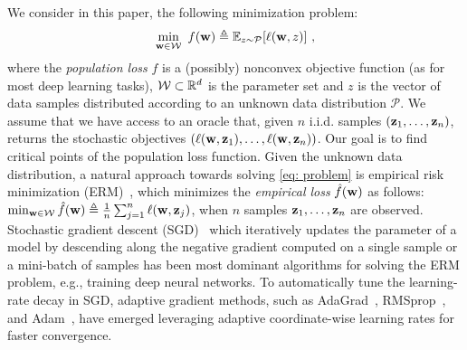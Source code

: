 \documentclass[11pt]{article}
\begin{document}
We consider in this paper, the following minimization problem:
\begin{equation} \label{eq: problem}
 \min_{\w \in \cW}~ f({\w})  \triangleq {\mathbb{E}_{z \sim \mathcal{P}}}[\ell(\w,z)]~,
\end{equation}
where the \emph{population loss} $f$ is a (possibly) nonconvex objective function (as for most deep learning tasks), $\cW \subset \R^d$ is the parameter set and $z$ is the vector of data samples distributed according to an unknown data distribution $\mathcal{P}$. 
We assume that we have access to an oracle that, given $n $ i.i.d. samples $(\mathbf{z}_{1}, \dots, \mathbf{z}_{n})$, returns the stochastic objectives $(\ell(\mathbf{w},\mathbf{z}_{1}), \dots, \ell(\mathbf{w},\mathbf{z}_{n}))$.
Our goal is to find critical points of the population loss function.
Given the unknown data distribution, a natural approach towards solving \eqref{eq: problem} is empirical risk minimization (ERM)~\citep{shbe14}, which minimizes the \emph{empirical loss} $\hat f(\mathbf{w})$ as follows: $\min_{\w \in \cW}     \hat f(\w)  \triangleq \frac{1}{n}\sum_{j =1}^{n} \ell(\w, \z_j)$, when $n$ samples $\mathbf{z}_{1}, \dots, \mathbf{z}_{n}$ are observed.
Stochastic gradient descent (SGD)~\citep{romo51} which iteratively updates the parameter of a model by descending along the negative gradient computed on a single sample or a mini-batch of samples has been most dominant algorithms for solving the ERM problem, e.g., training deep neural networks. To automatically tune the learning-rate decay in SGD, adaptive gradient methods, such as AdaGrad~\citep{duha11}, RMSprop~\citep{tige12}, and Adam~\citep{kiba15}, have emerged leveraging adaptive coordinate-wise learning rates for faster convergence.
\end{document}
